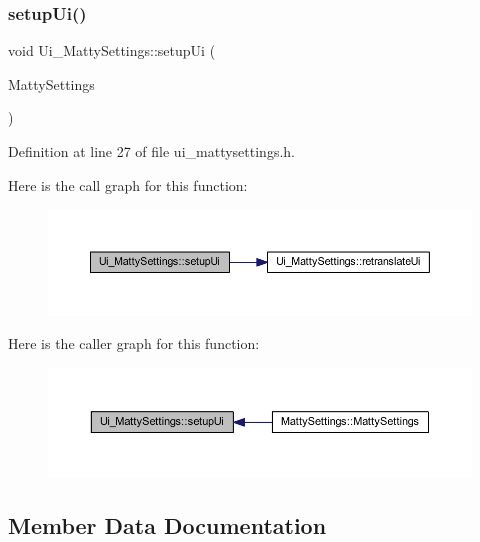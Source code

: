 \subsubsection{\texorpdfstring{setup\+Ui()}{setupUi()}}
{\footnotesize\ttfamily void Ui\+\_\+\+Matty\+Settings\+::setup\+Ui (\begin{DoxyParamCaption}\item[{Q\+Widget $\ast$}]{Matty\+Settings }\end{DoxyParamCaption})\hspace{0.3cm}{\ttfamily [inline]}}



Definition at line 27 of file ui\+\_\+mattysettings.\+h.

Here is the call graph for this function\+:
\nopagebreak
\begin{figure}[H]
\begin{center}
\leavevmode
\includegraphics[width=350pt]{classUi__MattySettings_aa5a49194b05cc0f4d7f06d99f18e253e_cgraph}
\end{center}
\end{figure}
Here is the caller graph for this function\+:
\nopagebreak
\begin{figure}[H]
\begin{center}
\leavevmode
\includegraphics[width=350pt]{classUi__MattySettings_aa5a49194b05cc0f4d7f06d99f18e253e_icgraph}
\end{center}
\end{figure}


\subsection{Member Data Documentation}
\hypertarget{classUi__MattySettings_a289ca61cb5fd260abf4fbe3d872f6676}{}\label{classUi__MattySettings_a289ca61cb5fd260abf4fbe3d872f6676} 
